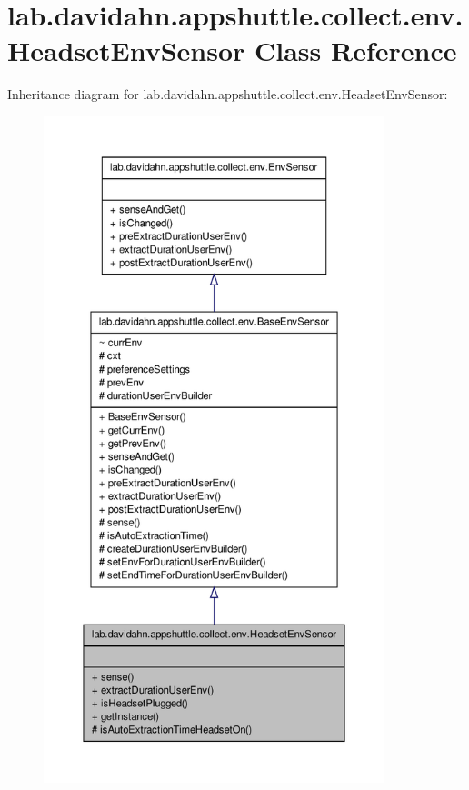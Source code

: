 \hypertarget{classlab_1_1davidahn_1_1appshuttle_1_1collect_1_1env_1_1_headset_env_sensor}{\section{lab.\-davidahn.\-appshuttle.\-collect.\-env.\-Headset\-Env\-Sensor \-Class \-Reference}
\label{classlab_1_1davidahn_1_1appshuttle_1_1collect_1_1env_1_1_headset_env_sensor}
}


\-Inheritance diagram for lab.\-davidahn.\-appshuttle.\-collect.\-env.\-Headset\-Env\-Sensor\-:
\nopagebreak
\begin{figure}[H]
\begin{center}
\leavevmode
\includegraphics[height=550pt]{classlab_1_1davidahn_1_1appshuttle_1_1collect_1_1env_1_1_headset_env_sensor__inherit__graph}
\end{center}
\end{figure}


